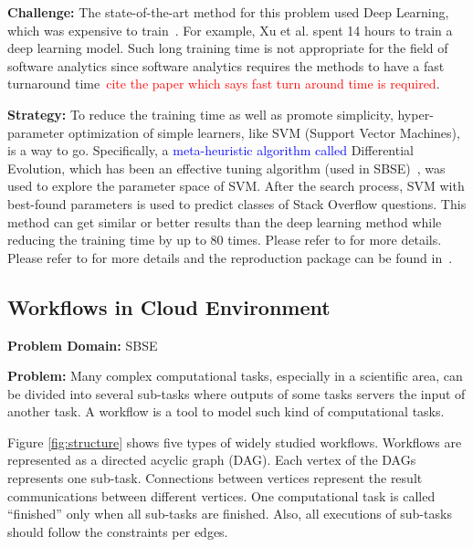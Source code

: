 \documentclass[sigconf,anonymous,review]{acmart}
\newcommand\llm[1]{\textcolor{blue}{#1\xspace}}
\begin{document}
\noindent\textbf{Challenge: } The state-of-the-art method for this problem used Deep Learning, which was expensive to train~\cite{xu2016predicting}. For example, Xu et al. spent 14 hours to train a deep learning model. Such long training time is not appropriate for the field of software analytics since software analytics requires the methods to have a fast turnaround time~\textcolor{red}{cite the paper which says fast turn around time is required}.

\noindent\textbf{Strategy: }To reduce the training time as well as promote simplicity, hyper-parameter optimization of simple learners, like SVM (Support Vector Machines), is a way to go. Specifically, a \llm{meta-heuristic algorithm called} Differential Evolution, which has been an effective tuning algorithm (used in SBSE)~\cite{fu2016tuning},
was used to explore the parameter space of SVM. After the search process,
 SVM with best-found parameters is used to predict classes of Stack Overflow questions. This method can get similar or better results
than the deep learning method while reducing the training time by up to 80 times. Please refer to \cite{fu2017easy} for more details. Please refer to \cite{fu2017easy} for more details and the reproduction package can be found in~.



\subsection{Workflows in Cloud Environment}
\textbf{Problem Domain: } SBSE


\noindent\textbf{Problem:} Many complex computational tasks, especially in a scientific area, can be divided into several sub-tasks where outputs of some tasks servers the input of another task. A workflow is a tool to
model such kind of computational tasks.



Figure \ref{fig:structure} shows five types of widely studied workflows. Workflows are represented as a directed acyclic graph (DAG). Each vertex of the DAGs represents one sub-task. Connections between vertices represent the result communications between different vertices. One computational task is called ``finished'' only when
all sub-tasks are finished. Also, all executions of sub-tasks should follow the constraints per edges.
\end{document}
